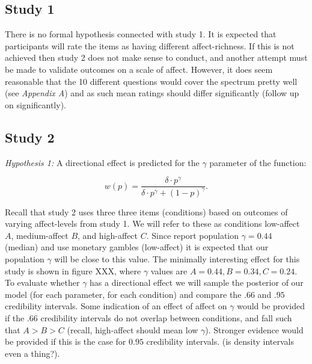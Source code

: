 \documentclass[12pt]{article}
\begin{document}
\subsection{Study 1}
There is no formal hypothesis connected with
study 1. It is expected that participants
will rate the items as having different
affect-richness. If this is not achieved then
study 2 does not make sense to conduct, and
another attempt must be made to validate
outcomes on a scale of affect. However, it
does seem reasonable that the 10 different
questions would cover the spectrum pretty well
(see \emph{Appendix A}) and as such mean
ratings should differ significantly
(follow up on significantly).

\subsection{Study 2}
\emph{Hypothesis 1:} A directional effect is
predicted for the $\gamma$ parameter of the function:

\[
	w(p) = \frac{\delta \cdot p^{\gamma}}
	{\delta \cdot p^{\gamma}+(1-p)^{\gamma}}
.\]

Recall that study 2 uses three three
items (conditions) based on outcomes of
varying affect-levels from study 1.
We will refer to these as conditions
low-affect $A$, medium-affect $B$, and
high-affect $C$. Since \textcite{gonzalez1999shape}
report population $\gamma = 0.44$ (median)
and use monetary gambles (low-affect)
it is expected that our population
$\gamma$ will be close to this value.
The minimally interesting effect for this
study is shown in figure XXX, where $\gamma$
values are $A = 0.44, B = 0.34, C = 0.24$.
To evaluate whether $\gamma$ has a directional
effect we will sample the posterior of
our model (for each parameter, for each
condition) and compare the  $.66$ and
 $.95$ credibility intervals. Some indication
 of an effect of affect on $\gamma$ would be
  provided if the  $.66$ credibility intervals do not
  overlap between conditions, and fall such
  that $A > B > C$ (recall, high-affect should
  mean low $\gamma$). Stronger evidence
  would be provided if this is the case for
  $0.95$ credibility intervals.
  (is density intervals even a thing?).
\end{document}
